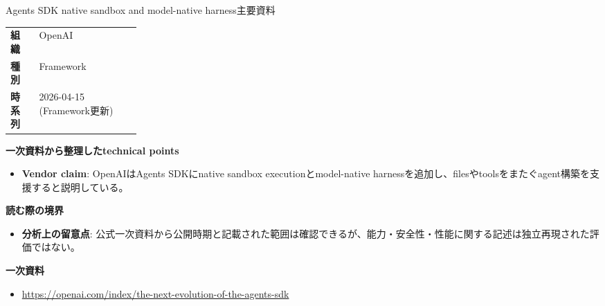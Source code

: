 \begin{technicalnote}{Agents SDK native sandbox and model-native harness}{主要資料}
\begingroup
\begin{tabularx}{\linewidth}{@{}>{\bfseries}p{0.22\linewidth}X@{}}
組織 & OpenAI \\
種別 & Framework \\
時系列 & 2026-04-15 (Framework更新) \\
\end{tabularx}
\smallskip
{\bfseries 一次資料から整理したtechnical points}
\begin{itemize}[leftmargin=1.5em,itemsep=0.35em]
\item \textbf{Vendor claim}: OpenAIはAgents SDKにnative sandbox executionとmodel-native harnessを追加し、filesやtoolsをまたぐagent構築を支援すると説明している。
\end{itemize}
\begin{minipage}{\linewidth}
{\bfseries 読む際の境界}
\begin{itemize}[leftmargin=1.5em,itemsep=0.35em]
\item \textbf{分析上の留意点}: 公式一次資料から公開時期と記載された範囲は確認できるが、能力・安全性・性能に関する記述は独立再現された評価ではない。
\end{itemize}
\begin{samepage}
{\bfseries 一次資料}
\begingroup\sloppy
\begin{itemize}[leftmargin=1.5em,itemsep=0.25em]
\item {\scriptsize\url{https://openai.com/index/the-next-evolution-of-the-agents-sdk}}
\end{itemize}
\endgroup
\end{samepage}
\end{minipage}
\endgroup
\end{technicalnote}
\medskip

